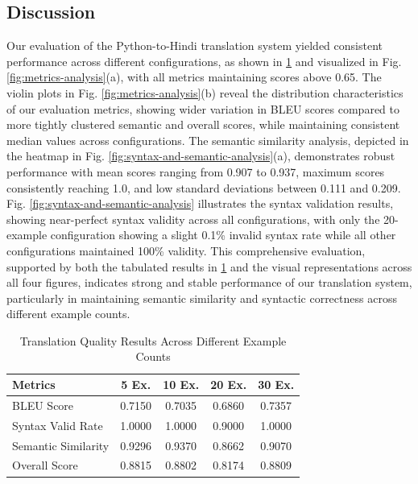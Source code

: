 \documentclass[11pt,a4paper]{article}
\begin{document}
\subsection{Discussion}
Our evaluation of the Python-to-Hindi translation system yielded consistent performance across different configurations, as shown in \ref{tab:translation-results} and visualized in Fig. \ref{fig:metrics-analysis}(a), with all metrics maintaining scores above 0.65. The violin plots in Fig.  \ref{fig:metrics-analysis}(b) reveal the distribution characteristics of our evaluation metrics, showing wider variation in BLEU scores compared to more tightly clustered semantic and overall scores, while maintaining consistent median values across configurations. The semantic similarity analysis, depicted in the heatmap in Fig. \ref{fig:syntax-and-semantic-analysis}(a), demonstrates robust performance with mean scores ranging from 0.907 to 0.937, maximum scores consistently reaching 1.0, and low standard deviations between 0.111 and 0.209. Fig. \ref{fig:syntax-and-semantic-analysis} illustrates the syntax validation results, showing near-perfect syntax validity across all configurations, with only the 20-example configuration showing a slight 0.1\% invalid syntax rate while all other configurations maintained 100\% validity. This comprehensive evaluation, supported by both the tabulated results in \ref{tab:translation-results} and the visual representations across all four figures, indicates strong and stable performance of our translation system, particularly in maintaining semantic similarity and syntactic correctness across different example counts.
\begin{table}[htbp]
    \small  %
    \centering
    \caption{Translation Quality Results Across Different Example Counts}
    \begin{tabular}{|l|c|c|c|c|}
    \hline
    \textbf{Metrics} & \textbf{5 Ex.} & \textbf{10 Ex.} & \textbf{20 Ex.} & \textbf{30 Ex.} \\
    \hline
    BLEU Score & 0.7150 & 0.7035 & 0.6860 & 0.7357 \\
    \hline
    Syntax Valid Rate & 1.0000 & 1.0000 & 0.9000 & 1.0000 \\
    \hline
    Semantic Similarity & 0.9296 & 0.9370 & 0.8662 & 0.9070 \\
    \hline
    Overall Score & 0.8815 & 0.8802 & 0.8174 & 0.8809 \\
    \hline
    \end{tabular}
    \label{tab:translation-results}
    \end{table}
\end{document}
